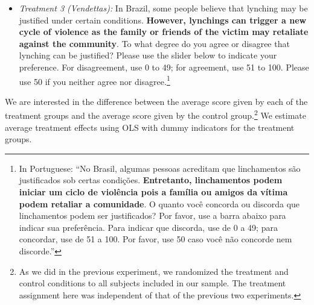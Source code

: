\documentclass[12pt,ansiapaper]{article}
\providecommand{\tightlist}{%
   \setlength{\itemsep}{0pt}\setlength{\parskip}{0pt}}
\begin{document}
\begin{itemize}
\tightlist
\item
  \emph{Treatment 3 (Vendettas):} In Brazil, some people believe that lynching may be justified under certain conditions. \textbf{However, lynchings can trigger a new cycle of violence as the family or friends of the victim may retaliate against the community}. To what degree do you agree or disagree that lynching can be justified? Please use the slider below to indicate your preference. For disagreement, use 0 to 49; for agreement, use 51 to 100. Please use 50 if you neither agree nor disagree.\footnote{In Portuguese: ``No Brasil, algumas pessoas acreditam que linchamentos são justificados sob certas condições. \textbf{Entretanto, linchamentos podem iniciar um ciclo de violência pois a família ou amigos da vítima podem retaliar a comunidade}. O quanto você concorda ou discorda que linchamentos podem ser justificados? Por favor, use a barra abaixo para indicar sua preferência. Para indicar que discorda, use de 0 a 49; para concordar, use de 51 a 100. Por favor, use 50 caso você não concorde nem discorde.''}
\end{itemize}

We are interested in the difference between the average score given by each of the treatment groups and the average score given by the control group.\footnote{As we did in the previous experiment, we randomized the treatment and control conditions to all subjects included in our sample. The treatment assignment here was independent of that of the previous two experiments.} We estimate average treatment effects using OLS with dummy indicators for the treatment groups.

\vspace{.5cm}
\end{document}
